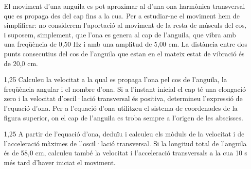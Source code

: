 El moviment d'una anguila es pot aproximar al d'una ona harmònica transversal que es propaga des del cap fins a la cua. Per a estudiar-ne el moviment hem de simplificar: no considerem l'aportació al moviment de la resta de músculs del cos, i suposem, simplement, que l'ona es genera al cap de l'anguila, que vibra amb una freqüència de 0,50 Hz i amb una amplitud de 5,00 cm. La distància entre dos punts consecutius del cos de l'anguila que estan en el mateix estat de vibració és de 20,0 cm.


\begin{apartat}{1,25}
Calculeu la velocitat a la qual es propaga l'ona pel cos de l'anguila, la freqüència angular i el nombre d'ona. Si a l'instant inicial el cap té una elongació zero i la velocitat d'oscil·lació transversal és positiva, determineu l'expressió de l'equació d'ona. Per a l'equació d'ona utilitzeu el sistema de coordenades de la figura superior, on el cap de l'anguila es troba sempre a l'origen de les abscisses.
\end{apartat}

\begin{apartat}{1,25}
A partir de l'equació d'ona, deduïu i calculeu els mòduls de la velocitat i de l'acceleració màximes de l'oscil·lació transversal. Si la longitud total de l'anguila és de 58,0 cm, calculeu també la velocitat i l'acceleració transversals a la cua 10 s més tard d'haver iniciat el moviment.
\end{apartat}
